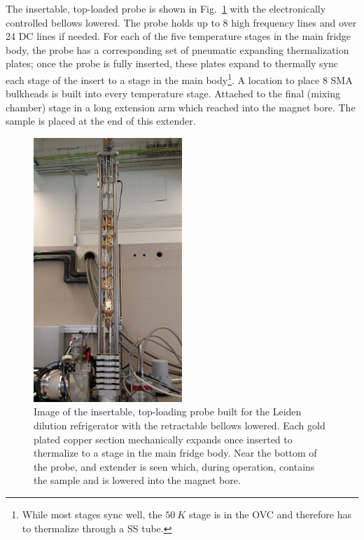 The insertable, top-loaded probe is shown in Fig.~\ref{Fig:Appen:Leiden_bellows_open} with the electronically controlled bellows lowered. The probe holds up to 8 high frequency lines and over 24 DC lines if needed. For each of the five temperature stages in the main fridge body, the probe has a corresponding set of pneumatic expanding thermalization plates; once the probe is fully inserted, these plates expand to thermally sync each stage of the insert to a stage in the main body\footnote{While most stages sync well, the $50~K$ stage is in the OVC and therefore has to thermalize through a SS tube.}. A location to place 8 SMA bulkheads is built into every temperature stage. Attached to the final (mixing chamber) stage in a long extension arm which reached into the magnet bore. The sample is placed at the end of this extender. 
\begin{figure}
\centering
\includegraphics[angle=-90,width = 0.5\textwidth]{figures/appendix/cryostats/Leiden_bellows_open.jpg}
\caption{Image of the insertable, top-loading probe built for the Leiden dilution refrigerator with the retractable bellows lowered. Each gold plated copper section mechanically expands once inserted to thermalize to a stage in the main fridge body. Near the bottom of the probe, and extender is seen which, during operation, contains the sample and is lowered into the magnet bore.}
\label{Fig:Appen:Leiden_bellows_open}
\end{figure}

